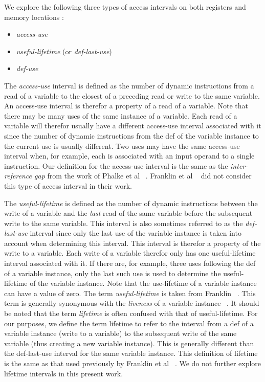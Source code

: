 \documentclass[10pt,dvips]{article}
\begin{document}
We explore the following three types of access intervals on
both registers and memory locations :
%
\begin{itemize}
\vspace{-0.1in}
\item \textit{access-use}
\vspace{-0.1in}
\item \textit{useful-lifetime} (or \textit{def-last-use})
\vspace{-0.1in}
\item \textit{def-use}
\vspace{-0.1in}
\end{itemize}
%
The \textit{access-use} interval is defined as the number of
dynamic instructions from a read of a variable to the closest
of a preceding read or write to the same variable.
An access-use interval is therefor a property of a read of a variable.
Note that there may be many uses of the same instance of a variable.
Each read of a variable will therefor
usually have a different access-use interval associated with it
since the number of dynamic instructions from the def
of the variable instance to the current use is usually different.
Two uses may have the same access-use interval when,
for example, each is associated with an input operand to a single
instruction.
Our definition for the access-use interval is the same as the
\textit{inter-reference gap} from the work of 
Phalke et al ~\cite{phalke95gap}.
Franklin et al ~\cite{Franklin92} did not consider this type
of access interval in their work.

The \textit{useful-lifetime} is defined as the number of
dynamic instructions between the write of a variable
and the \textit{last} read of the same variable before the
subsequent write to the same variable.
This interval is also sometimes referred to as the \textit{def-last-use}
interval since only the last use of the variable instance is taken
into account when determining this interval.
This interval is therefor a property of the write to a variable.
Each write of a variable therefor only has one
useful-lifetime interval associated with it.
If there are, for example, three uses following the
def of a variable instance, only the last such use is
used to determine the useful-lifetime of the variable instance.
Note that the use-lifetime of a variable instance can have a value of 
zero.
The term \textit{useful-lifetime} is taken from Franklin ~\cite{Franklin92}.
This term is generally synonymous with the \textit{liveness} of
a variable instance ~\cite{hennpatt95}.
It should be noted that the term \textit{lifetime} is often confused
with that of useful-lifetime.
For our purposes, we define the term lifetime to refer to
the interval from a def of a variable instance (write to a variable)
to the
subsequent write of the same variable (thus creating a new
variable instance).
This is generally different than the def-last-use interval
for the same variable instance.
This definition of lifetime is the same as that used previously by
Franklin et al ~\cite{Franklin92}.
We do not further explore lifetime intervals in this
present work.
\end{document}
